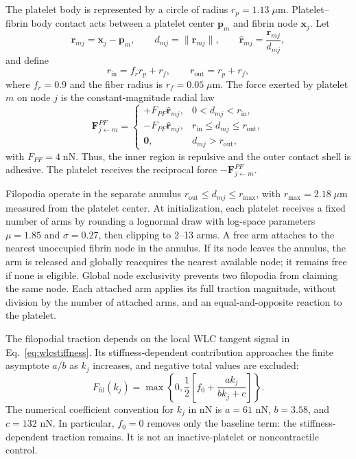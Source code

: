 \documentclass[twocolumn, 10pt]{article}
\begin{document}
The platelet body is represented by a circle of radius $r_p=1.13\;\mu\mathrm{m}$. Platelet--fibrin body contact acts between a platelet center $\mathbf p_m$ and fibrin node $\mathbf x_j$. Let
\begin{equation}
\mathbf r_{mj}=\mathbf x_j-\mathbf p_m,
\qquad d_{mj}=\|\mathbf r_{mj}\|,
\qquad \widehat{\mathbf r}_{mj}=\frac{\mathbf r_{mj}}{d_{mj}},
\end{equation}
and define
\begin{equation}
r_{\mathrm{in}}=f_r r_p+r_f,
\qquad r_{\mathrm{out}}=r_p+r_f,
\end{equation}
where $f_r=0.9$ and the fiber radius is $r_f=0.05\;\mu\mathrm{m}$. The force exerted by platelet $m$ on node $j$ is the constant-magnitude radial law
\begin{equation}
\mathbf F_{j\leftarrow m}^{PF}=
\begin{cases}
+F_{PF}\widehat{\mathbf r}_{mj},
&0<d_{mj}<r_{\mathrm{in}},\\
-F_{PF}\widehat{\mathbf r}_{mj},
&r_{\mathrm{in}}\le d_{mj}\le r_{\mathrm{out}},\\
\mathbf 0,&d_{mj}>r_{\mathrm{out}},
\end{cases}
\label{eq:platelet-fibrin}
\end{equation}
with $F_{PF}=4\;\mathrm{nN}$. Thus, the inner region is repulsive and the outer contact shell is adhesive. The platelet receives the reciprocal force $-\mathbf F_{j\leftarrow m}^{PF}$.

Filopodia operate in the separate annulus $r_{\mathrm{out}}\le d_{mj}\le r_{\max}$, with $r_{\max}=2.18\;\mu\mathrm{m}$ measured from the platelet center. At initialization, each platelet receives a fixed number of arms by rounding a lognormal draw with log-space parameters $\mu=1.85$ and $\sigma=0.27$, then clipping to 2--13 arms. A free arm attaches to the nearest unoccupied fibrin node in the annulus. If its node leaves the annulus, the arm is released and globally reacquires the nearest available node; it remains free if none is eligible. Global node exclusivity prevents two filopodia from claiming the same node. Each attached arm applies its full traction magnitude, without division by the number of attached arms, and an equal-and-opposite reaction to the platelet.

The filopodial traction depends on the local WLC tangent signal in Eq.~\eqref{eq:wlcstiffness}. Its stiffness-dependent contribution approaches the finite asymptote $a/b$ as $k_j$ increases, and negative total values are excluded:
\begin{equation}
F_{\mathrm{fil}}(k_j)
= \max\!\left\{0,\frac{1}{2}\left[f_0 + \frac{a k_j}{b k_j + c}\right]\right\}.
\label{eq:wlctraction}
\end{equation}
The numerical coefficient convention for $k_j$ in nN is $a=61$ nN, $b=3.58$, and $c=132$ nN. In particular, $f_0=0$ removes only the baseline term: the stiffness-dependent traction remains. It is not an inactive-platelet or noncontractile control.
\end{document}
